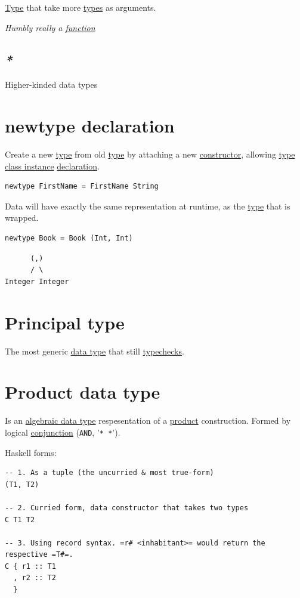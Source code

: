 \documentclass[a4paper,14pt,oneside]{book}
\begin{document}
\hyperref[org1eff537]{Type} that take more \hyperref[orge9a3a14]{types} as arguments.

\emph{Humbly really a \hyperref[org679af45]{function}}

\subsection{\emph{*}}
\label{sec:org2303a5e}

\label{org3a1baa7}Higher-kinded data types

\section{\label{org5335c70}newtype declaration}
\label{sec:orgf9a55cb}
Create a new \hyperref[org1eff537]{type} from old \hyperref[org1eff537]{type} by attaching a new \hyperref[orgef7386c]{constructor}, allowing \hyperref[org36c6142]{type class instance} \hyperref[org0fb3698]{declaration}.
\begin{verbatim}
newtype FirstName = FirstName String
\end{verbatim}

Data will have exactly the same representation at runtime, as the \hyperref[org1eff537]{type} that is wrapped.

\begin{verbatim}
newtype Book = Book (Int, Int)
\end{verbatim}
\begin{verbatim}
      (,)
      / \
Integer Integer
\end{verbatim}

\section{\label{org105c6a9}Principal type}
\label{sec:org7f0f6d5}
The most generic \hyperref[org194580e]{data type} that still \hyperref[org508f61e]{typechecks}.

\section{\label{org17c5776}Product data type}
\label{sec:org44f63b5}
Is an \hyperref[orgef9f436]{algebraic data type} respesentation of a \hyperref[org90a2f94]{product} construction.
Formed by logical \hyperref[org576f71f]{conjunction} (\texttt{AND}, '\texttt{* *}').

Haskell forms:
\begin{verbatim}
-- 1. As a tuple (the uncurried & most true-form)
(T1, T2)

-- 2. Curried form, data constructor that takes two types
C T1 T2

-- 3. Using record syntax. =r# <inhabitant>= would return the respective =T#=.
C { r1 :: T1
  , r2 :: T2
  }
\end{verbatim}
\end{document}
